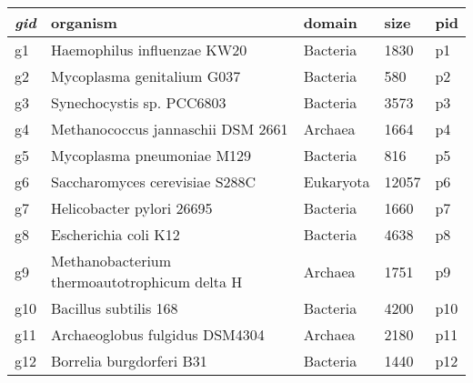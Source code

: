 \begin{tabular}{|l|l|l|l|l|}
\hline 
\textit{gid}  &                   organism                    &  domain    & size   & pid \\
\hline
 g1   & Haemophilus influenzae KW20                   & Bacteria   &  1830  & p1\\
 g2   & Mycoplasma genitalium G037                    & Bacteria   &   580  & p2\\
 g3   & Synechocystis sp. PCC6803                     & Bacteria   &  3573  & p3\\
 g4   & Methanococcus jannaschii DSM 2661             & Archaea    &  1664  & p4\\
 g5   & Mycoplasma pneumoniae M129                    & Bacteria   &   816  & p5\\
 g6   & Saccharomyces cerevisiae S288C                & Eukaryota  & 12057  & p6\\
 g7   & Helicobacter pylori 26695                     & Bacteria   &  1660  & p7\\
 g8   & Escherichia coli K12                          & Bacteria   &  4638  & p8\\
 g9   & Methanobacterium thermoautotrophicum delta H  & Archaea    &  1751  & p9\\
 g10  & Bacillus subtilis 168                         & Bacteria   &  4200  & p10\\
 g11  & Archaeoglobus fulgidus DSM4304                & Archaea    &  2180  & p11\\
 g12  & Borrelia burgdorferi B31                      & Bacteria   &  1440  & p12\\
\hline
\end{tabular}
